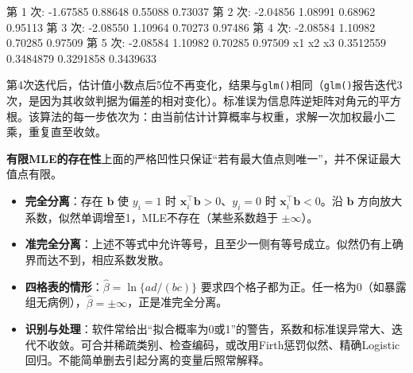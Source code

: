\begin{routput}
第 1 次:  -1.67585   0.88648   0.55088   0.73037 
第 2 次:  -2.04856   1.08991   0.68962   0.95113 
第 3 次:  -2.08550   1.10964   0.70273   0.97486 
第 4 次:  -2.08584   1.10982   0.70285   0.97509 
第 5 次:  -2.08584   1.10982   0.70285   0.97509 
                 x1        x2        x3 
0.3512559 0.3484879 0.3291858 0.3439633 
\end{routput}
第4次迭代后，估计值小数点后5位不再变化，结果与\texttt{glm()}相同（\texttt{glm()}报告迭代3次，是因为其收敛判据为偏差的相对变化）。标准误为信息阵逆矩阵对角元的平方根。该算法的每一步依次为：由当前估计计算概率与权重，求解一次加权最小二乘，重复直至收敛。

\textbf{有限MLE的存在性}\quad 上面的严格凹性只保证“若有最大值点则唯一”，并不保证最大值点有限。
\begin{itemize}
\item \textbf{完全分离}：存在 $\bm b$ 使 $y_i=1$ 时 $\bm x_i^\top\bm b>0$、$y_i=0$ 时 $\bm x_i^\top\bm b<0$。沿 $\bm b$ 方向放大系数，似然单调增至1，MLE不存在（某些系数趋于 $\pm\infty$）。
\item \textbf{准完全分离}：上述不等式中允许等号，且至少一侧有等号成立。似然仍有上确界而达不到，相应系数发散。
\item \textbf{四格表的情形}：$\widehat\beta=\ln\{ad/(bc)\}$ 要求四个格子都为正。任一格为0（如暴露组无病例），$\widehat\beta=\pm\infty$，正是准完全分离。
\item \textbf{识别与处理}：软件常给出“拟合概率为0或1”的警告，系数和标准误异常大、迭代不收敛。可合并稀疏类别、检查编码，或改用Firth惩罚似然、精确Logistic回归。不能简单删去引起分离的变量后照常解释。
\end{itemize}
